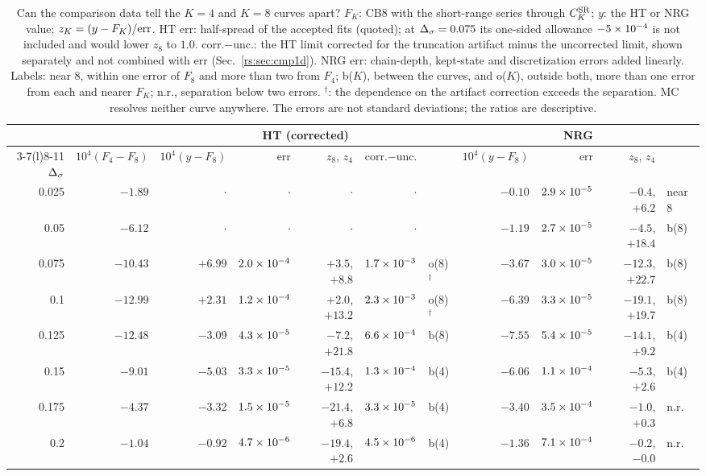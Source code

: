 \begin{table}[htbp]\centering\scriptsize\setlength{\tabcolsep}{2.5pt}
\begin{tabular}{@{}r r r r r r l r r r l@{}}
\toprule
 & & \multicolumn{5}{c}{HT (corrected)} & \multicolumn{4}{c}{NRG}\\
\cmidrule(lr){3-7}\cmidrule(l){8-11}
$\Delta_\sigma$ & $10^4(F_4{-}F_8)$ & $10^4(y{-}F_8)$ & err & $z_8$, $z_4$ & corr.$-$unc. & & $10^4(y{-}F_8)$ & err & $z_8$, $z_4$ & \\ \midrule
0.025 & $-1.89$ & $\cdot$ & $\cdot$ & $\cdot$ & $\cdot$ &  & $-0.10$ & $2.9\times10^{-5}$ & $-0.4$, $+6.2$ & near 8\\
0.05 & $-6.12$ & $\cdot$ & $\cdot$ & $\cdot$ & $\cdot$ &  & $-1.19$ & $2.7\times10^{-5}$ & $-4.5$, $+18.4$ & b(8)\\
0.075 & $-10.43$ & $+6.99$ & $2.0\times10^{-4}$ & $+3.5$, $+8.8$ & $1.7\times10^{-3}$ & o(8)$^\dagger$ & $-3.67$ & $3.0\times10^{-5}$ & $-12.3$, $+22.7$ & b(8)\\
0.1 & $-12.99$ & $+2.31$ & $1.2\times10^{-4}$ & $+2.0$, $+13.2$ & $2.3\times10^{-3}$ & o(8)$^\dagger$ & $-6.39$ & $3.3\times10^{-5}$ & $-19.1$, $+19.7$ & b(8)\\
0.125 & $-12.48$ & $-3.09$ & $4.3\times10^{-5}$ & $-7.2$, $+21.8$ & $6.6\times10^{-4}$ & b(8) & $-7.55$ & $5.4\times10^{-5}$ & $-14.1$, $+9.2$ & b(4)\\
0.15 & $-9.01$ & $-5.03$ & $3.3\times10^{-5}$ & $-15.4$, $+12.2$ & $1.3\times10^{-4}$ & b(4) & $-6.06$ & $1.1\times10^{-4}$ & $-5.3$, $+2.6$ & b(4)\\
0.175 & $-4.37$ & $-3.32$ & $1.5\times10^{-5}$ & $-21.4$, $+6.8$ & $3.3\times10^{-5}$ & b(4) & $-3.40$ & $3.5\times10^{-4}$ & $-1.0$, $+0.3$ & n.r.\\
0.2 & $-1.04$ & $-0.92$ & $4.7\times10^{-6}$ & $-19.4$, $+2.6$ & $4.5\times10^{-6}$ & b(4) & $-1.36$ & $7.1\times10^{-4}$ & $-0.2$, $-0.0$ & n.r.\\
\bottomrule
\end{tabular}
\caption{Can the comparison data tell the $K=4$ and $K=8$ curves apart? $F_K$: CB8 with the
short-range series through $C^{\mathrm{SR}}_K$; $y$: the HT or NRG value; $z_K=(y-F_K)/{\rm err}$. HT err:
half-spread of the accepted fits (quoted); at $\Delta_\sigma=0.075$ its one-sided allowance $-5\times10^{-4}$
is not included and would lower $z_8$ to $1.0$. corr.$-$unc.: the HT limit corrected for the
truncation artifact minus the uncorrected limit, shown separately and not combined with err
(Sec.~\ref{rs:sec:cmp1d}). NRG err: chain-depth, kept-state and discretization errors added
linearly. Labels: near 8, within one error of $F_8$ and more than two from $F_4$; b($K$),
between the curves, and o($K$), outside both, more than one error from each and nearer $F_K$;
n.r., separation below two errors. $^\dagger$: the dependence on the artifact correction
exceeds the separation. MC resolves neither curve anywhere. The errors are not
standard deviations; the ratios are descriptive.}
\label{rs:tab:k4k8}
\end{table}

